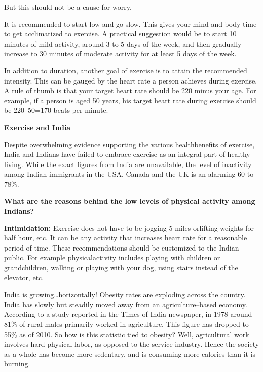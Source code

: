But this should not be a cause for worry.

It is recommended to start low and go slow. This gives your mind and body time to get acclimatized to exercise. A practical suggestion would be to start 10 minutes of mild activity, around 3 to 5 days of the week, and then gradually increase to 30 minutes of moderate activity for at least 5 days of the week.

In addition to duration, another goal of exercise is to attain the recommended intensity. This can be gauged by the heart rate a person achieves during exercise. A rule of thumb is that your target heart rate should be 220 minus your age. For example, if a person is aged 50 years, his target heart rate during exercise should be 220–50=170 beats per minute.

\noindent\textbf{Exercise and India}

Despite overwhelming evidence supporting the various health\break benefits of exercise, India and Indians have failed to embrace exercise as an integral part of healthy living. While the exact figures from India are unavailable, the level of inactivity among Indian immigrants in the USA, Canada and the UK is an alarming 60 to 78\%.

\clearpage

\noindent\textbf{What are the reasons behind the low levels of physical activity among Indians?}
\vskip 10pt

\textbf{Intimidation:} Exercise does not have to be jogging 5 miles or\break lifting weights for half hour, etc. It can be any activity that increases heart rate for a reasonable period of time. These recommendations should be customized to the Indian public. For example physical\break activity includes playing with children or grandchildren, walking or playing with your dog, using stairs instead of the elevator, etc.

India is growing…horizontally! Obesity rates are exploding across the country. India has slowly but steadily moved away from an agri\-cul\-ture–based economy. According to a study reported in the Times of India newspaper, in 1978 around 81\% of rural males primarily worked in agriculture. This figure has dropped to 55\% as of 2010. So how is this statistic tied to obesity? Well, agricultural work involves hard physical labor, as opposed to the service industry. Hence the society as a whole has become more sedentary, and is consuming more calories than it is burning.

\vskip 10pt

